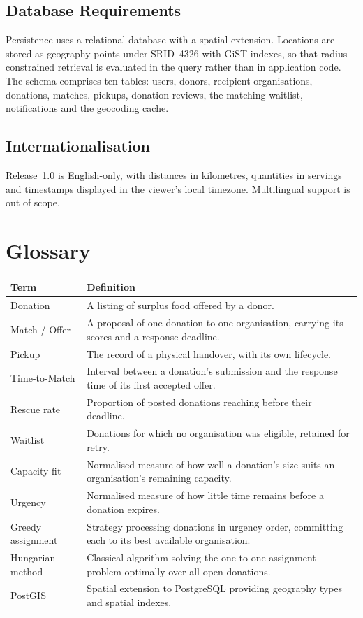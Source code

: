 \documentclass[11pt,a4paper]{article}
\newcommand{\code}[1]{\texttt{\detokenize{#1}}}
\begin{document}
\subsection{Database Requirements}
Persistence uses a relational database with a spatial extension. Locations are
stored as geography points under SRID~4326 with GiST indexes, so that
radius-constrained retrieval is evaluated in the query rather than in
application code. The schema comprises ten tables: users, donors, recipient
organisations, donations, matches, pickups, donation reviews, the matching
waitlist, notifications and the geocoding cache.

\subsection{Internationalisation}
Release~1.0 is English-only, with distances in kilometres, quantities in
servings and timestamps displayed in the viewer's local timezone. Multilingual
support is out of scope.

\appendix
\section{Glossary}
\begin{longtable}{@{}p{3.8cm}p{10.8cm}@{}}
\toprule
\textbf{Term} & \textbf{Definition} \\
\midrule
\endhead
Donation & A listing of surplus food offered by a donor. \\
Match / Offer & A proposal of one donation to one organisation, carrying its scores and a response deadline. \\
Pickup & The record of a physical handover, with its own lifecycle. \\
Time-to-Match & Interval between a donation's submission and the response time of its first accepted offer. \\
Rescue rate & Proportion of posted donations reaching \code{COMPLETED} before their deadline. \\
Waitlist & Donations for which no organisation was eligible, retained for retry. \\
Capacity fit & Normalised measure of how well a donation's size suits an organisation's remaining capacity. \\
Urgency & Normalised measure of how little time remains before a donation expires. \\
Greedy assignment & Strategy processing donations in urgency order, committing each to its best available organisation. \\
Hungarian method & Classical algorithm solving the one-to-one assignment problem optimally over all open donations. \\
PostGIS & Spatial extension to PostgreSQL providing geography types and spatial indexes. \\
\bottomrule
\end{longtable}
\end{document}
